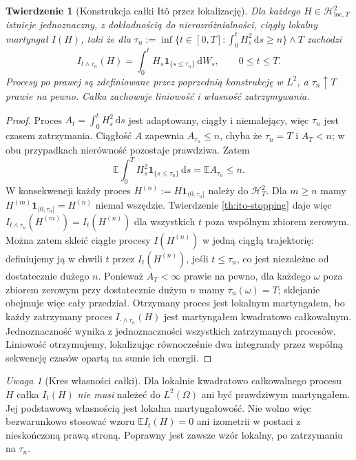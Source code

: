 \documentclass[11pt,a4paper,oneside]{report}
\numberwithin{equation}{chapter}
\theoremstyle{plain}
\newtheorem{twierdzenie}{Twierdzenie}[chapter]
\theoremstyle{definition}
\theoremstyle{remark}
\newtheorem{uwaga}{Uwaga}[chapter]
\newcommand{\E}{\mathbb{E}}
\newcommand{\calH}{\mathcal{H}}
\newcommand{\ind}[1]{\mathbf{1}_{#1}}
\newcommand{\dd}{\mathrm{d}}
\begin{document}
\begin{twierdzenie}[Konstrukcja całki Itô przez lokalizację]\label{th:ito-local}
Dla każdego $H\in\calH_{\mathrm{loc},T}^2$
istnieje jednoznaczny, z dokładnością do nierozróżnialności,
ciągły lokalny martyngał $I(H)$, taki że dla
$\tau_n:=\inf\{t\in[0,T]:\int_0^t H_s^2\,\dd s\ge n\}\wedge T$
zachodzi
\[
I_{t\wedge\tau_n}(H)
=\int_0^tH_s\ind{\{s\le\tau_n\}}\,\dd W_s,
\qquad 0\le t\le T.
\tag{2.12}
\]
Procesy po prawej są zdefiniowane przez
poprzednią konstrukcję w $L^2$, a $\tau_n\uparrow T$
prawie na pewno. Całka zachowuje liniowość i własność
zatrzymywania.
\end{twierdzenie}
\begin{proof}
Proces $A_t=\int_0^tH_s^2\,\dd s$ jest adaptowany,
ciągły i niemalejący, więc $\tau_n$ jest czasem
zatrzymania. Ciągłość $A$ zapewnia
$A_{\tau_n}\le n$, chyba że $\tau_n=T$ i $A_T<n$;
w obu przypadkach nierówność pozostaje prawdziwa.
Zatem
\[
\E\int_0^T H_s^2\ind{\{s\le\tau_n\}}\,\dd s
=\E A_{\tau_n}\le n.
\]
W konsekwencji każdy proces
$H^{(n)}:=H\ind{(0,\tau_n]}$ należy do $\calH_T^2$.
Dla $m\ge n$ mamy
$H^{(m)}\ind{(0,\tau_n]}=H^{(n)}$ niemal wszędzie.
Twierdzenie \ref{th:ito-stopping} daje więc
$I_{t\wedge\tau_n}(H^{(m)})=I_t(H^{(n)})$ dla wszystkich
$t$ poza wspólnym zbiorem zerowym.
Można zatem skleić ciągłe procesy $I(H^{(n)})$
w jedną ciągłą trajektorię: definiujemy ją w chwili $t$
przez $I_t(H^{(n)})$, jeśli $t\le\tau_n$, co jest
niezależne od dostatecznie dużego $n$.
Ponieważ $A_T<\infty$ prawie na pewno, dla każdego
$\omega$ poza zbiorem zerowym przy dostatecznie dużym
$n$ mamy $\tau_n(\omega)=T$; sklejanie obejmuje więc
cały przedział. Otrzymany proces jest lokalnym martyngałem,
bo każdy zatrzymany proces $I_{\cdot\wedge\tau_n}(H)$
jest martyngałem kwadratowo całkowalnym.
Jednoznaczność wynika z jednoznaczności wszystkich
zatrzymanych procesów. Liniowość otrzymujemy,
lokalizując równocześnie dwa integrandy przez
wspólną sekwencję czasów opartą na sumie ich energii.
\end{proof}

\begin{uwaga}[Kres własności całki]
Dla lokalnie kwadratowo całkowalnego procesu $H$ całka
$I_t(H)$ \emph{nie musi} należeć do $L^2(\Omega)$ ani
być prawdziwym martyngałem. Jej podstawową własnością
jest lokalna martyngałowość. Nie wolno więc bezwarunkowo
stosować wzoru $\E I_t(H)=0$ ani izometrii w postaci
z nieskończoną prawą stroną. Poprawny jest zawsze
wzór lokalny, po zatrzymaniu na $\tau_n$.
\end{uwaga}
\end{document}
